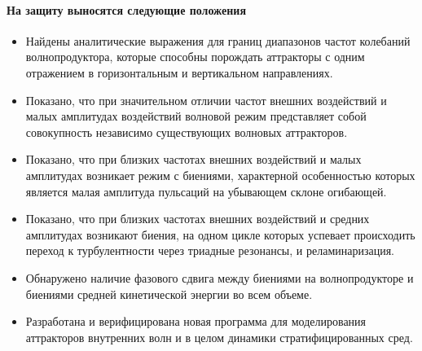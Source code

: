 \documentclass[utf8x]{G7-32} %
\begin{document}
\paragraph{На защиту выносятся следующие положения}
\begin{itemize}

  \item Найдены аналитические выражения для границ диапазонов частот колебаний волнопродуктора, которые способны порождать аттракторы с одним отражением в горизонтальным и вертикальном направлениях.

  \item Показано, что при значительном отличии частот внешних воздействий и малых амплитудах воздействий волновой режим представляет собой совокупность независимо существующих волновых аттракторов.

  \item Показано, что при близких частотах внешних воздействий и малых амплитудах возникает режим с биениями, характерной особенностью которых является малая амплитуда пульсаций на убывающем склоне огибающей.

  \item Показано, что при близких частотах внешних воздействий и средних амплитудах возникают биения, на одном цикле которых успевает происходить переход к турбулентности через триадные резонансы, и реламинаризация.
    
  \item Обнаружено наличие фазового сдвига между биениями на волнопродукторе и биениями средней кинетической энергии во всем объеме.
    

  \item Разработана и верифицирована новая программа для моделирования аттракторов внутренних волн и в целом динамики стратифицированных сред.
    

    
    
    
\end{itemize}
\end{document}
